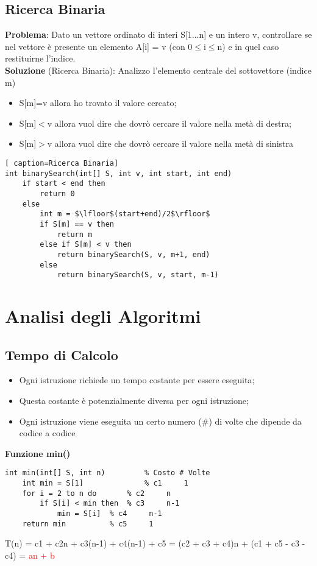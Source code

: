 \documentclass[../cheatSheetAlgoritmi.tex]{subfiles}
\begin{document}
\subsection{Ricerca Binaria}
\textbf{Problema}: Dato un vettore ordinato di interi S[1...n] e un intero v, controllare se nel vettore è presente un elemento A[i] = v (con 0$\leq$i$\leq$n) e in quel caso restituirne l'indice.\\
\textbf{Soluzione} (Ricerca Binaria): Analizzo l'elemento centrale del sottovettore (indice m)
\begin{itemize}
	\item S[m]=v allora ho trovato il valore cercato;
	\item S[m]$<$v allora vuol dire che dovrò cercare il valore nella metà di destra;
	\item S[m]$>$v allora vuol dire che dovrò cercare il valore nella metà di sinistra
\end{itemize}
\begin{lstlisting}[ caption=Ricerca Binaria]
int binarySearch(int[] S, int v, int start, int end)
	if start < end then
		return 0
	else
		int m = $\lfloor$(start+end)/2$\rfloor$
		if S[m] == v then
			return m
		else if S[m] < v then
			return binarySearch(S, v, m+1, end)
		else
			return binarySearch(S, v, start, m-1)
\end{lstlisting}

\section{Analisi degli Algoritmi}
\subsection{Tempo di Calcolo}
\begin{itemize}
	\item Ogni istruzione richiede un tempo costante per essere eseguita;
	\item Questa costante è potenzialmente diversa per ogni istruzione;
	\item Ogni istruzione viene eseguita un certo numero (\#) di volte che dipende da codice a codice
\end{itemize}
\textbf{Funzione min()}
\begin{lstlisting}[caption=Ricerca Minimo + calcolo del costo]
int min(int[] S, int n)			% Costo # Volte
	int min = S[1]	    		% c1   	 1
	for i = 2 to n do		% c2     n
		if S[i] < min then 	% c3 	 n-1
			min = S[i]	% c4 	 n-1
	return min			% c5	 1
\end{lstlisting}
T(n) = c1 + c2n + c3(n-1) + c4(n-1) + c5 = (c2 + c3 + c4)n + (c1 + c5 - c3 - c4) = \textcolor{red}{an + b}
\end{document}
